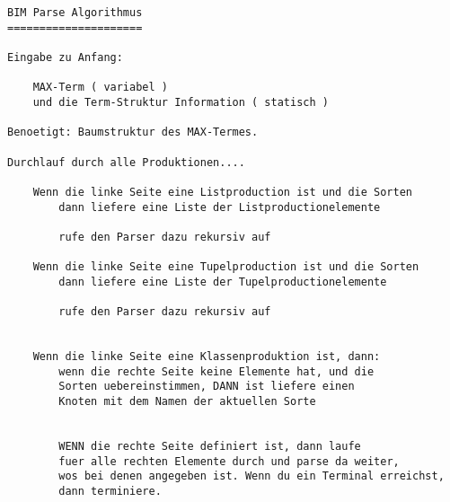 
\begin{verbatim}
BIM Parse Algorithmus
=====================

Eingabe zu Anfang:

	MAX-Term ( variabel )
	und die Term-Struktur Information ( statisch )

Benoetigt: Baumstruktur des MAX-Termes.

Durchlauf durch alle Produktionen....

	Wenn die linke Seite eine Listproduction ist und die Sorten
		dann liefere eine Liste der Listproductionelemente
	
		rufe den Parser dazu rekursiv auf

	Wenn die linke Seite eine Tupelproduction ist und die Sorten
		dann liefere eine Liste der Tupelproductionelemente

		rufe den Parser dazu rekursiv auf


	Wenn die linke Seite eine Klassenproduktion ist, dann:
		wenn die rechte Seite keine Elemente hat, und die
		Sorten uebereinstimmen, DANN ist liefere einen
		Knoten mit dem Namen der aktuellen Sorte

		
		WENN die rechte Seite definiert ist, dann laufe
		fuer alle rechten Elemente durch und parse da weiter,
		wos bei denen angegeben ist. Wenn du ein Terminal erreichst,
		dann terminiere.

\end{verbatim}

